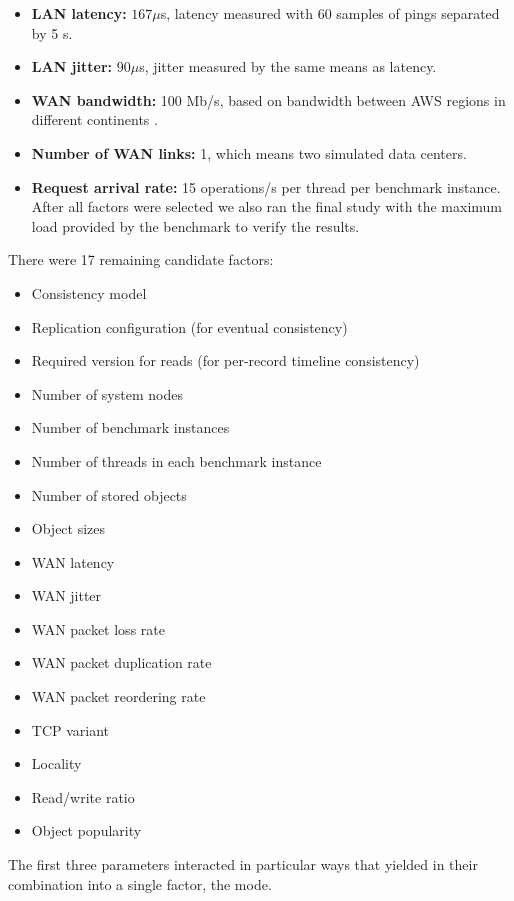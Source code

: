\documentclass[man,floatsintext,12pt]{apa6}
\begin{document}
\begin{itemize}
\item \textbf{LAN latency:} $167\mu$s, latency measured with 60 samples of
pings separated by 5 s.

\item \textbf{LAN jitter:} $90\mu$s, jitter measured by the same means as
latency.

\item \textbf{WAN bandwidth:} 100 Mb/s, based on bandwidth between AWS regions
in different continents \parencite{Topchiy2013}.

\item \textbf{Number of WAN links:} 1, which means two simulated data centers.

\item \textbf{Request arrival rate:} 15 operations/s per thread per benchmark
instance. After all factors were selected we also ran the final study with the
maximum load provided by the benchmark to verify the results.

\end{itemize}

There were 17 remaining candidate factors:

\begin{itemize}
\item Consistency model
\item Replication configuration (for eventual consistency)
\item Required version for reads (for per-record timeline consistency)
\item Number of system nodes
\item Number of benchmark instances
\item Number of threads in each benchmark instance
\item Number of stored objects
\item Object sizes
\item WAN latency
\item WAN jitter
\item WAN packet loss rate
\item WAN packet duplication rate
\item WAN packet reordering rate
\item TCP variant
\item Locality
\item Read/write ratio
\item Object popularity
\end{itemize}

The first three parameters interacted in particular ways that yielded in their
combination into a single factor, the mode.
\end{document}
